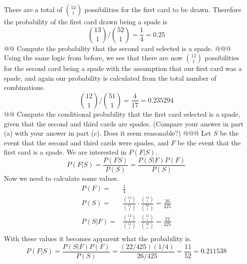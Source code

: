 \documentclass[10pt]{article}
\begin{document}
\begin{easylist}[enumerate]
    There are a total of $\binom{52}{1}$ possibilities for the first card to be drawn. Therefore the probability of the
    first card drawn being a spade is
        \[ \binom{13}{1} \Big / \binom{52}{1} = \frac{1}{4} = \boxed{0.25} \]
    @@ Compute the probability that the second card selected is a spade.
    @@@ Using the same logic from before, we see that there are now $\binom{12}{1}$ possibilities for the second card
    being a spade with the assumption that our first card was a spade, and again our probability is calculated from the
    total number of combinations.
        \[ \binom{12}{1} \Big / \binom{51}{1} = \frac{4}{17} = \boxed{0.235294} \]
    @@ Compute the conditional probability that the first card selected is a spade, given that the second and third
    cards are spades. (Compare your answer in part (a) with your answer in part (c). Does it seem reasonable?)
    @@@ Let $S$ be the event that the second and third cards were spades, and $F$ be the event that the first card is a
    spade. We are interested in $P(F|S)$.
        \[ P(F|S) = \frac{P(FS)}{P(S)} = \frac{P(S|F) P(F)}{P(S)} \]
    Now we need to calculate some values.
        \[
            \begin{aligned}
                P(F) =& \frac{1}{4}\\
                P(S) =& \frac{\binom{13}{1}}{\binom{51}{1}} \cdot \frac{\binom{12}{1}}{\binom{50}{1}} = \frac{26}{425}\\
                P(S|F) =& \frac{\binom{12}{1}}{\binom{51}{1}} \cdot \frac{\binom{11}{1}}{\binom{50}{1}} = \frac{22}{425}\\
            \end{aligned}
        \]
    With these values it becomes apparent what the probability is.
        \[ P(F|S) = \frac{P(S|F) P(F)}{P(S)} = \frac{(22/425)(1/4)}{26/425} = \frac{11}{52} = \boxed{0.211538} \]
\end{easylist}
\end{document}
